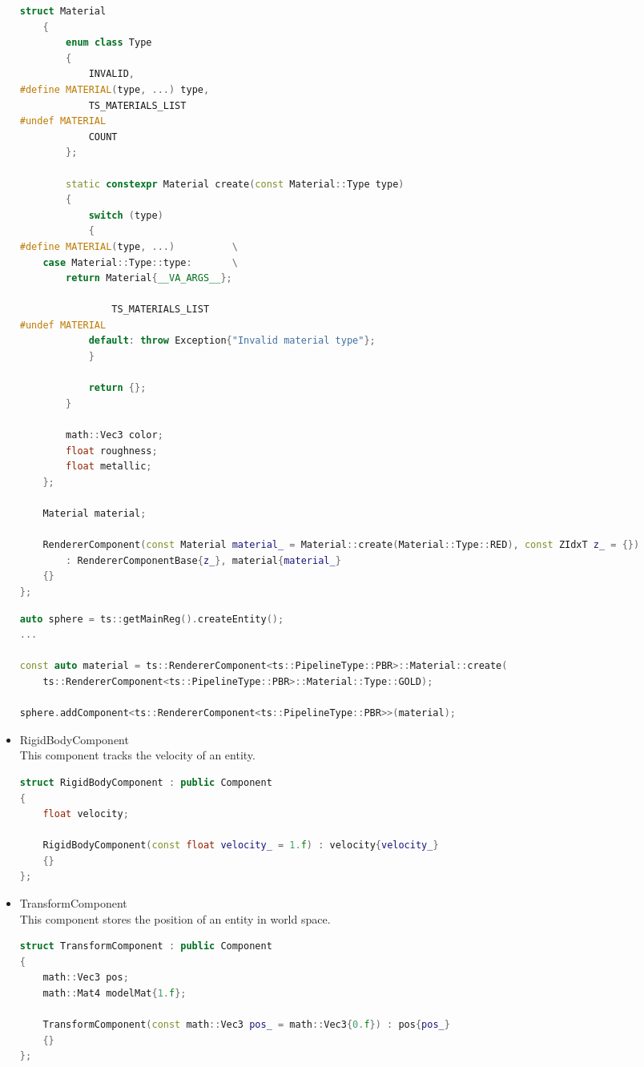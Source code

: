 \begin{itemize}
\begin{lstlisting}[language=c++, caption=Renderer PBR component struct (./engine/include/tsengine/ecs/components/renderer\_component.h)]
    struct Material
    {
        enum class Type
        {
            INVALID,
#define MATERIAL(type, ...) type, 
            TS_MATERIALS_LIST
#undef MATERIAL
            COUNT
        };

        static constexpr Material create(const Material::Type type)
        {
            switch (type)
            {
#define MATERIAL(type, ...)          \
    case Material::Type::type:       \
        return Material{__VA_ARGS__};

                TS_MATERIALS_LIST
#undef MATERIAL
            default: throw Exception{"Invalid material type"};
            }

            return {};
        }

        math::Vec3 color;
        float roughness;
        float metallic;
    };

    Material material;

    RendererComponent(const Material material_ = Material::create(Material::Type::RED), const ZIdxT z_ = {})
        : RendererComponentBase{z_}, material{material_}
    {}
};
\end{lstlisting}

\begin{lstlisting}[language=c++, caption=Process of adding PBR Renderer Component with material (./game/game.cpp)]
auto sphere = ts::getMainReg().createEntity();
...

const auto material = ts::RendererComponent<ts::PipelineType::PBR>::Material::create(
    ts::RendererComponent<ts::PipelineType::PBR>::Material::Type::GOLD);

sphere.addComponent<ts::RendererComponent<ts::PipelineType::PBR>>(material);
\end{lstlisting}
    \item RigidBodyComponent\\
    \label{rigidbody_component}
    This component tracks the velocity of an entity.
\begin{lstlisting}[language=c++, caption=Rigid body component (./engine/include/tsengine/ecs/components/rigidbody\_component.h)]
struct RigidBodyComponent : public Component
{
    float velocity;

    RigidBodyComponent(const float velocity_ = 1.f) : velocity{velocity_}
    {}
};
\end{lstlisting}
    \item TransformComponent\\
    \label{transform_component}
    This component stores the position of an entity in world space.
\begin{lstlisting}[language=c++, caption=Trasnform component (./engine/include/tsengine/ecs/components/transform\_component.h)]
struct TransformComponent : public Component
{
    math::Vec3 pos;
    math::Mat4 modelMat{1.f};

    TransformComponent(const math::Vec3 pos_ = math::Vec3{0.f}) : pos{pos_}
    {}
};
\end{lstlisting}
\end{itemize}

